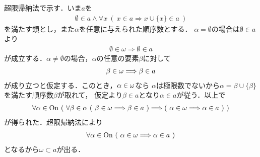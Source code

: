 	\begin{prf}
		超限帰納法で示す．いま$a$を
		\begin{align}
			\emptyset \in a \wedge \forall x\ 
			(\ x \in a \Longrightarrow x \cup \{x\} \in a\ )
		\end{align}
		を満たす類とし，また$\alpha$を任意に与えられた順序数とする．
		$\alpha = \emptyset$の場合は$\emptyset \in a$より
		\begin{align}
			\emptyset \in \omega \Longrightarrow \emptyset \in a
		\end{align}
		が成立する．$\alpha \neq \emptyset$の場合，$\alpha$の任意の要素$\beta$に対して
		\begin{align}
			\beta \in {\bf \omega} \Longrightarrow \beta \in a
		\end{align}
		が成り立つと仮定する．このとき，$\alpha \in {\bf \omega}$なら
		$\alpha$は極限数でないから$\alpha = \beta \cup \{\beta\}$を満たす順序数$\beta$が取れて，
		仮定より$\beta \in a$となり$\alpha \in a$が従う．以上で
		\begin{align}
			\forall \alpha \in \ON\ (\ \forall \beta \in \alpha\ (\ \beta \in {\bf \omega} \Longrightarrow \beta \in a\ ) \Longrightarrow (\ \alpha \in {\bf \omega} \Longrightarrow \alpha \in a\ )\ )
		\end{align}
		が得られた．超限帰納法により
		\begin{align}
			\forall \alpha \in \mathrm{On}\ (\ \alpha \in {\bf \omega} \Longrightarrow \alpha \in a\ )
		\end{align}
		となるから$\omega \subset a$が出る．
		\QED
	\end{prf}
	
